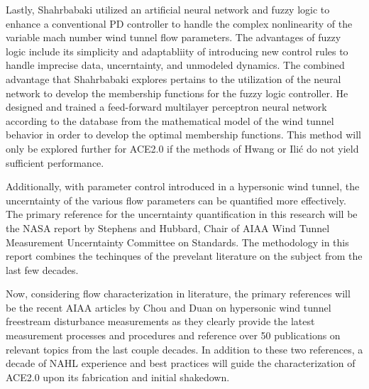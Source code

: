 Lastly, Shahrbabaki utilized an artificial neural network and fuzzy logic to enhance a conventional PD controller to handle the complex nonlinearity of the variable mach number wind tunnel flow parameters. The advantages of fuzzy logic include its simplicity and adaptabliity of introducing new control rules to handle imprecise data, uncerntainty, and unmodeled dynamics. The combined advantage that Shahrbabaki explores pertains to the utilization of the neural network to develop the membership functions for the fuzzy logic controller. He designed and trained a feed-forward multilayer perceptron neural network according to the database from the mathematical model of the wind tunnel behavior in order to develop the optimal membership functions. This method will only be explored further for ACE2.0 if the methods of Hwang or Ili\'c do not yield sufficient performance.

Additionally, with parameter control introduced in a hypersonic wind tunnel, the uncerntainty of the various flow parameters can be quantified more effectively. The primary reference for the uncerntainty quantification in this research will be the NASA report by Stephens \cite{stephens-hubbard} and Hubbard, Chair of AIAA Wind Tunnel Measurement Uncerntainty Committee on Standards. The methodology in this report combines the techinques of the prevelant literature on the subject from the last few decades.

Now, considering flow characterization in literature, the primary references will be the recent AIAA articles by Chou \cite{chou} and Duan \cite{duan} on hypersonic wind tunnel freestream disturbance measurements as they clearly provide the latest measurement processes and procedures and reference over 50 publications on relevant topics from the last couple decades. In addition to these two references, a decade of NAHL experience and best practices will guide the characterization of ACE2.0 upon its fabrication and initial shakedown.


